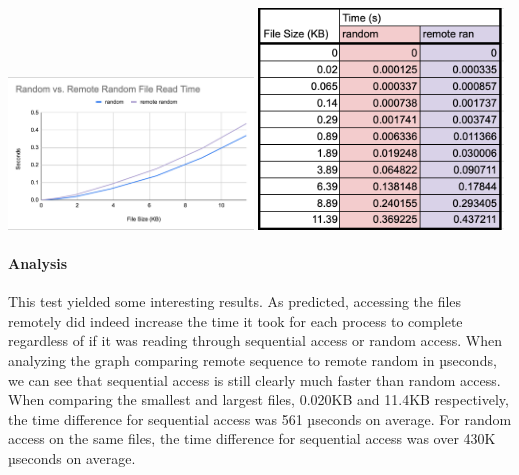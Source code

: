 \hspace{.25cm}

\includegraphics[width=6.5cm]{4.3 Results/r vs rr graph.png}
\hspace{.5cm}
\includegraphics[width=6.5cm]{4.3 Results/table r v rr.png}

\hspace{.25cm}


\paragraph{Analysis}

This test yielded some interesting results. As predicted, accessing the files remotely did indeed increase the time it took for each process to complete regardless of if it was reading through sequential access or random access. When analyzing the graph comparing remote sequence to remote random in µseconds, we can see that sequential access is still clearly much faster than random access. When comparing the smallest and largest files, 0.020KB and 11.4KB respectively, the time difference for sequential access was 561 µseconds on average. For random access on the same files, the time difference for sequential access was over 430K µseconds on average.

